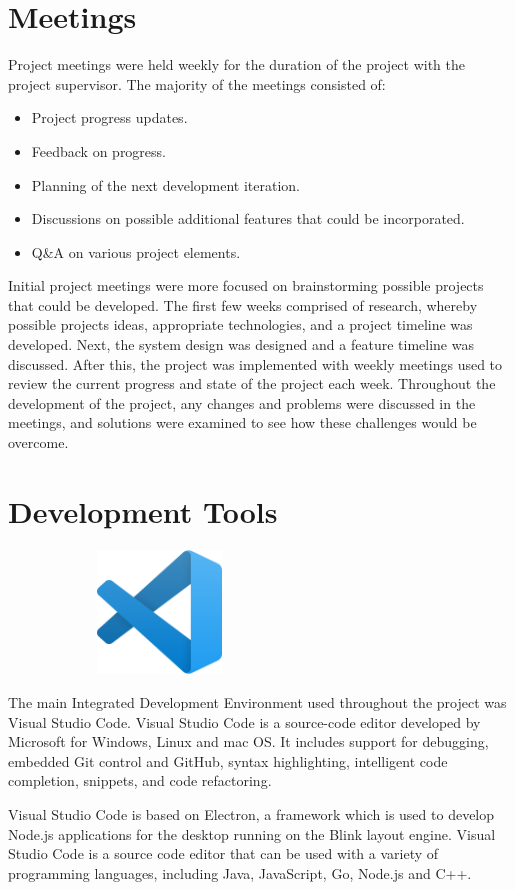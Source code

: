 \newpage
\section{Meetings}
Project meetings were held weekly for the duration of the project with the
project supervisor. The majority of the meetings consisted of:
\begin{itemize}
    \item Project progress updates.
    \item Feedback on progress.
    \item Planning of the next development iteration.
    \item Discussions on possible additional features that could be
    incorporated.
    \item Q&A on various project elements.
\end{itemize}
\par
\medskip
Initial project meetings were more focused on brainstorming possible projects
that could be developed. The first few weeks comprised of research, whereby 
possible projects ideas, appropriate technologies, and a project timeline was
developed. Next, the system design was designed and a feature timeline was discussed. After this, the project was implemented with weekly meetings used to review the current progress and state of the project each week. Throughout the development of the project, any changes and problems were discussed in the meetings, and solutions were examined to see how these challenges would be overcome.

\section{Development Tools}
\begin{center}
    \includegraphics[width=8cm,height=3.3cm,keepaspectratio]{images/vscode}
\end{center}
The main Integrated Development Environment used throughout the project was 
Visual Studio Code. Visual Studio Code is a source-code editor developed by 
Microsoft for Windows, Linux and mac OS. It includes support for debugging, 
embedded Git control and GitHub, syntax highlighting, intelligent code 
completion, snippets, and code refactoring. 
\par
\bigskip
Visual Studio Code is based on Electron, a framework which is used to develop
Node.js applications for the desktop running on the Blink layout engine. Visual 
Studio Code is a source code editor that can be used with a variety of 
programming languages, including Java, JavaScript, Go, Node.js and C++.

